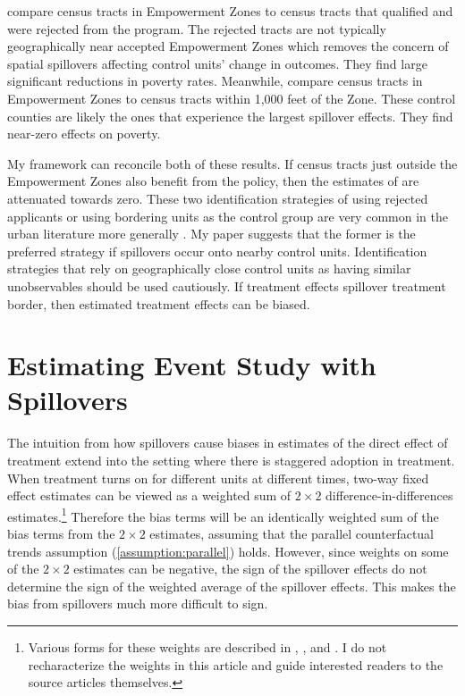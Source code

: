 \documentclass[11pt]{article}
\begin{document}
\citet{Busso_Gregory_Kline_2013} compare census tracts in Empowerment Zones to census tracts that qualified and were rejected from the program. The rejected tracts are not typically geographically near accepted Empowerment Zones which removes the concern of spatial spillovers affecting control units' change in outcomes. They find large significant reductions in poverty rates. Meanwhile, \citet{Neumark_Kolko_2010} compare census tracts in Empowerment Zones to census tracts within 1,000 feet of the Zone. These control counties are likely the ones that experience the largest spillover effects. They find near-zero effects on poverty. 

My framework can reconcile both of these results. If census tracts just outside the Empowerment Zones also benefit from the policy, then the estimates of \citet{Neumark_Kolko_2010} are attenuated towards zero. These two identification strategies of using rejected applicants or using bordering units as the control group are very common in the urban literature more generally \citep{Baum-Snow_Ferreira_2015}. My paper suggests that the former is the preferred strategy if spillovers occur onto nearby control units. Identification strategies that rely on geographically close control units as having similar unobservables should be used cautiously. If treatment effects spillover treatment border, then estimated treatment effects can be biased.



\section{Estimating Event Study with Spillovers}
\label{sec:event_study}

The intuition from how spillovers cause biases in estimates of the direct effect of treatment extend into the setting where there is staggered adoption in treatment. When treatment turns on for different units at different times, two-way fixed effect estimates can be viewed as a weighted sum of $2 \times 2$ difference-in-differences estimates.\footnote{Various forms for these weights are described in \citet{Goodman-Bacon_2018}, \citet{Sun_Abraham_2020}, and \citet{deChaisemartin_DHaultfoeuille_2019}. I do not recharacterize the weights in this article and guide interested readers to the source articles themselves.} Therefore the bias terms will be an identically weighted sum of the bias terms from the $2 \times 2$ estimates, assuming that the parallel counterfactual trends assumption (\ref{assumption:parallel}) holds. However, since weights on some of the $2 \times 2$ estimates can be negative, the sign of the spillover effects do not determine the sign of the weighted average of the spillover effects. This makes the bias from spillovers much more difficult to sign. 
\end{document}

